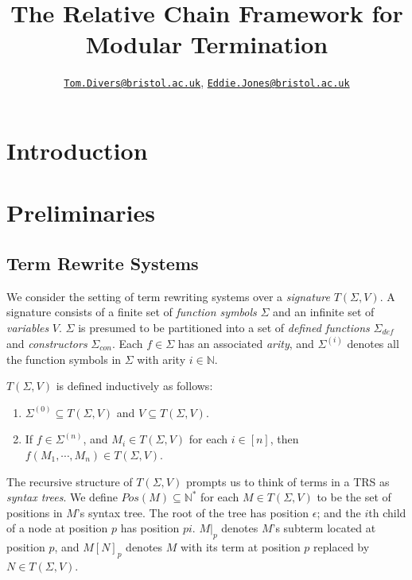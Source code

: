 \documentclass{article}
\title{The Relative Chain Framework for Modular Termination}
\author{\href{mailto:oi24939@bristol.ac.uk}{\texttt{Tom.Divers@bristol.ac.uk}}, \href{mailto:eddie.jones@bristol.ac.uk}{\texttt{Eddie.Jones@bristol.ac.uk}}}
\date{}
\begin{document}
\maketitle

\section{Introduction}


\section{Preliminaries}

\subsection{Term Rewrite Systems}

We consider the setting of term rewriting systems over a \emph{signature} $T(\Sigma, V)$. A signature consists of a finite set of \emph{function symbols} $\Sigma$ and an infinite set of \emph{variables} $V$. $\Sigma$ is presumed to be partitioned into a set of \emph{defined functions} $\Sigma_{def}$ and \emph{constructors} $\Sigma_{con}$. Each $f \in \Sigma$ has an associated \emph{arity}, and $\Sigma^{(i)}$ denotes all the function symbols in $\Sigma$ with arity $i \in \mathbb{N}$.

$T(\Sigma, V)$ is defined inductively as follows: \begin{enumerate}
    \item $\Sigma^{(0)} \subseteq T(\Sigma, V)$ and $V \subseteq T(\Sigma, V)$. 
    \item If $f \in \Sigma^{(n)}$, and $M_i \in T(\Sigma, V)$ for each $i \in [n]$, then $f(M_1, \cdots, M_n) \in T(\Sigma, V)$. 
\end{enumerate}

The recursive structure of $T(\Sigma, V)$ prompts us to think of terms in a TRS as \emph{syntax trees}. We define $Pos(M) \subseteq \mathbb{N}^*$ for each $M \in T(\Sigma, V)$ to be the set of positions in $M$'s syntax tree. The root of the tree has position $\epsilon$; and the $i$th child of a node at position $p$ has position $pi$. $M|_p$ denotes $M$'s subterm located at position $p$, and $M[N]_p$ denotes $M$ with its term at position $p$ replaced by $N \in T(\Sigma, V)$. 
\end{document}
